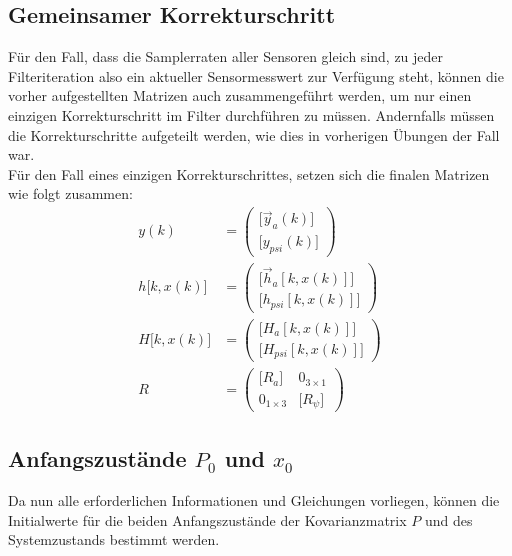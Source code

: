 \documentclass[12pt,a4paper]{article}
\begin{document}
		\subsection{Gemeinsamer Korrekturschritt}
		Für den Fall, dass die Samplerraten aller Sensoren gleich sind, zu jeder Filteriteration also ein aktueller Sensormesswert zur Verfügung steht, können die vorher aufgestellten Matrizen auch zusammengeführt werden, um nur einen einzigen Korrekturschritt im Filter durchführen zu müssen. Andernfalls müssen die Korrekturschritte aufgeteilt werden, wie dies in vorherigen Übungen der Fall war.\\
		Für den Fall eines einzigen Korrekturschrittes, setzen sich die finalen Matrizen wie folgt zusammen:
		\begin{align}
			y(k)&=\begin{pmatrix}
			\big[\vec{y}_{a}(k)\big]\\[0.5em]
			\big[y_{psi}(k)\big]
			\end{pmatrix}\\[1em]
			h\big[k,x(k)\big]&=\begin{pmatrix}
			\big[\vec{h}_{a}[k,x(k)]\big]\\[0.5em]
			\big[h_{psi}[k,x(k)]\big]
			\end{pmatrix}\\[1em]
			H\big[k,x(k)\big]&=\begin{pmatrix}
			\big[H_{a}[k,x(k)]\big]\\[0.5em]
			\big[H_{psi}[k,x(k)]\big]
			\end{pmatrix}\\[1em]
			R&=\begin{pmatrix}
			\big[R_{a}\big] & 0_{3\times 1} \\[0.5em]
			0_{1\times 3} & \big[R_{\psi}\big] 
			\end{pmatrix}
		\end{align}
		\subsection{Anfangszustände $P_{0}$ und $x_{0}$}\label{subsec:Anfangszustände}
		Da nun alle erforderlichen Informationen und Gleichungen vorliegen, können die Initialwerte für die beiden Anfangszustände der Kovarianzmatrix $P$ und des Systemzustands bestimmt werden.\\
		
\end{document}
